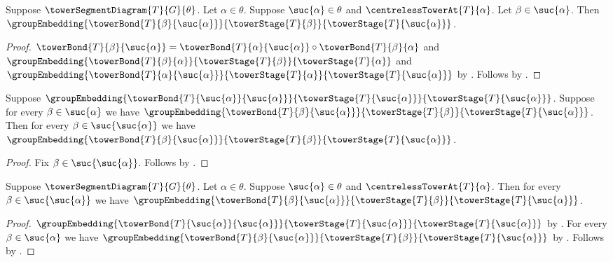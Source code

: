 \begin{proposition}\label{centreless_tower_successor_old_bond_embedding}
    Suppose $\towerSegmentDiagram{T}{G}{\theta}$.
    Let $\alpha\in\theta$.
    Suppose $\suc{\alpha}\in\theta$ and
        $\centrelessTowerAt{T}{\alpha}$.
    Let $\beta\in\suc{\alpha}$.
    Then $\groupEmbedding
        {\towerBond{T}{\beta}{\suc{\alpha}}}
        {\towerStage{T}{\beta}}
        {\towerStage{T}{\suc{\alpha}}}$.
\end{proposition}
\begin{proof}
    $\towerBond{T}{\beta}{\suc{\alpha}}=
            \towerBond{T}{\alpha}{\suc{\alpha}}\circ
                \towerBond{T}{\beta}{\alpha}$ and
        $\groupEmbedding
            {\towerBond{T}{\beta}{\alpha}}
            {\towerStage{T}{\beta}}
            {\towerStage{T}{\alpha}}$ and
        $\groupEmbedding
            {\towerBond{T}{\alpha}{\suc{\alpha}}}
            {\towerStage{T}{\alpha}}
            {\towerStage{T}{\suc{\alpha}}}$ by
        .
    Follows by
        .
\end{proof}

\begin{proposition}\label{tower_successor_embedding_cases}
    Suppose $\groupEmbedding
        {\towerBond{T}{\suc{\alpha}}{\suc{\alpha}}}
        {\towerStage{T}{\suc{\alpha}}}
        {\towerStage{T}{\suc{\alpha}}}$.
    Suppose for every $\beta\in\suc{\alpha}$ we have
        $\groupEmbedding
            {\towerBond{T}{\beta}{\suc{\alpha}}}
            {\towerStage{T}{\beta}}
            {\towerStage{T}{\suc{\alpha}}}$.
    Then for every $\beta\in\suc{\suc{\alpha}}$ we have
        $\groupEmbedding
            {\towerBond{T}{\beta}{\suc{\alpha}}}
            {\towerStage{T}{\beta}}
            {\towerStage{T}{\suc{\alpha}}}$.
\end{proposition}
\begin{proof}
    Fix $\beta\in\suc{\suc{\alpha}}$.
    Follows by .
\end{proof}

\begin{proposition}\label{centreless_tower_successor_bonds}
    Suppose $\towerSegmentDiagram{T}{G}{\theta}$.
    Let $\alpha\in\theta$.
    Suppose $\suc{\alpha}\in\theta$ and
        $\centrelessTowerAt{T}{\alpha}$.
    Then for every $\beta\in\suc{\suc{\alpha}}$ we have
        $\groupEmbedding
            {\towerBond{T}{\beta}{\suc{\alpha}}}
            {\towerStage{T}{\beta}}
            {\towerStage{T}{\suc{\alpha}}}$.
\end{proposition}
\begin{proof}
    $\groupEmbedding
        {\towerBond{T}{\suc{\alpha}}{\suc{\alpha}}}
        {\towerStage{T}{\suc{\alpha}}}
        {\towerStage{T}{\suc{\alpha}}}$ by
        .
    For every $\beta\in\suc{\alpha}$ we have
        $\groupEmbedding
            {\towerBond{T}{\beta}{\suc{\alpha}}}
            {\towerStage{T}{\beta}}
            {\towerStage{T}{\suc{\alpha}}}$ by
        .
    Follows by .
\end{proof}

